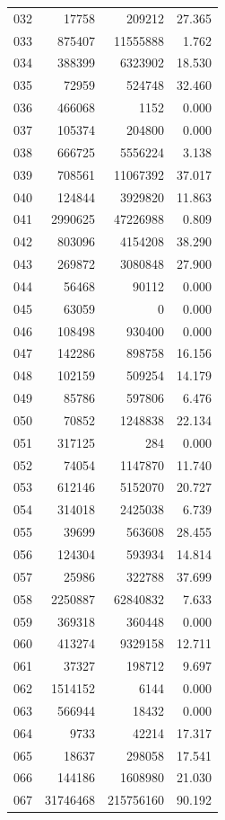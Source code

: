 \documentclass[anonymous,notoc]{gmcm2026}
\begin{document}
\begin{longtable}{lrrr}
032 & 17758 & 209212 & 27.365 \\
033 & 875407 & 11555888 & 1.762 \\
034 & 388399 & 6323902 & 18.530 \\
035 & 72959 & 524748 & 32.460 \\
036 & 466068 & 1152 & 0.000 \\
037 & 105374 & 204800 & 0.000 \\
038 & 666725 & 5556224 & 3.138 \\
039 & 708561 & 11067392 & 37.017 \\
040 & 124844 & 3929820 & 11.863 \\
041 & 2990625 & 47226988 & 0.809 \\
042 & 803096 & 4154208 & 38.290 \\
043 & 269872 & 3080848 & 27.900 \\
044 & 56468 & 90112 & 0.000 \\
045 & 63059 & 0 & 0.000 \\
046 & 108498 & 930400 & 0.000 \\
047 & 142286 & 898758 & 16.156 \\
048 & 102159 & 509254 & 14.179 \\
049 & 85786 & 597806 & 6.476 \\
050 & 70852 & 1248838 & 22.134 \\
051 & 317125 & 284 & 0.000 \\
052 & 74054 & 1147870 & 11.740 \\
053 & 612146 & 5152070 & 20.727 \\
054 & 314018 & 2425038 & 6.739 \\
055 & 39699 & 563608 & 28.455 \\
056 & 124304 & 593934 & 14.814 \\
057 & 25986 & 322788 & 37.699 \\
058 & 2250887 & 62840832 & 7.633 \\
059 & 369318 & 360448 & 0.000 \\
060 & 413274 & 9329158 & 12.711 \\
061 & 37327 & 198712 & 9.697 \\
062 & 1514152 & 6144 & 0.000 \\
063 & 566944 & 18432 & 0.000 \\
064 & 9733 & 42214 & 17.317 \\
065 & 18637 & 298058 & 17.541 \\
066 & 144186 & 1608980 & 21.030 \\
067 & 31746468 & 215756160 & 90.192 \\

\end{longtable}
\end{document}
